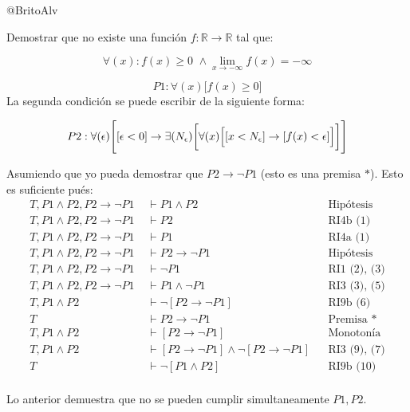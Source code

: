 \documentclass[14pt]{extarticle}
\begin{document}
@BritoAlv


\begin{tcolorbox}[colback=blue!5!white,colframe=blue!75!black, title = Enunciado]
Demostrar que no existe una función $f: \mathbb{R} \to \mathbb{R}$ tal que:

    $$\forall (x):  f(x) \geq 0 \, \, \wedge 
    \lim_{x \to -\infty}f(x) = -\infty$$
    
\end{tcolorbox}

$$P1: \forall(x) \biggl[ f(x) \geq 0 \biggr]$$
La segunda condición se puede escribir de la  siguiente forma:

$$P2: \forall (\epsilon)\Biggl[ [\epsilon < 0] \rightarrow  \exists(N_\epsilon) \biggl[  \forall(x) \Bigl[   [x < N_\epsilon] \rightarrow [f(x) < \epsilon] \Bigr] \biggr]   \Biggr]$$

Asumiendo que yo pueda demostrar que $P2 \rightarrow \lnot  P1 $ (esto es una premisa $*$). Esto es suficiente pués:
\begin{align}
    T, P1 \wedge P2, P2 \rightarrow \lnot  P1  \, \, &\vdash P1 \wedge P2 &&\text{Hipótesis} \\
    T, P1 \wedge P2, P2 \rightarrow \lnot  P1 \, \, &\vdash P2 &&\text{RI4b (1)}\\
    T, P1 \wedge P2, P2 \rightarrow \lnot  P1 \, \, &\vdash P1 &&\text{RI4a (1) }\\    
    T, P1 \wedge P2, P2 \rightarrow \lnot  P1 \, \, &\vdash P2 \rightarrow \lnot  P1 &&\text{Hipótesis}\\
    T, P1 \wedge P2, P2 \rightarrow \lnot  P1 \, \, &\vdash \lnot P1  &&\text{RI1 (2), (3)}\\
    T, P1 \wedge P2, P2 \rightarrow \lnot  P1 \, \, &\vdash P1 \wedge \lnot  P1  &&\text{RI3 (3), (5)}\\
    T, P1 \wedge P2 \, \, &\vdash \lnot[P2 \rightarrow \lnot P1]  &&\text{RI9b (6)}\\
    T &\vdash P2 \rightarrow \lnot P1 &&\text{Premisa *}\\
    T, P1 \wedge P2 \, \, &\vdash [P2 \rightarrow \lnot P1]  &&\text{Monotonía}\\
    T, P1 \wedge P2 \, \, &\vdash [P2 \rightarrow \lnot P1] \wedge \lnot[P2 \rightarrow \lnot P1] &&\text{RI3 (9), (7)} \\
    T  \, \, &\vdash \lnot [P1 \wedge P2] &&\text{RI9b (10)} \\
\end{align}
  
Lo anterior demuestra que no se pueden cumplir simultaneamente $P1,P2$.
\end{document}
